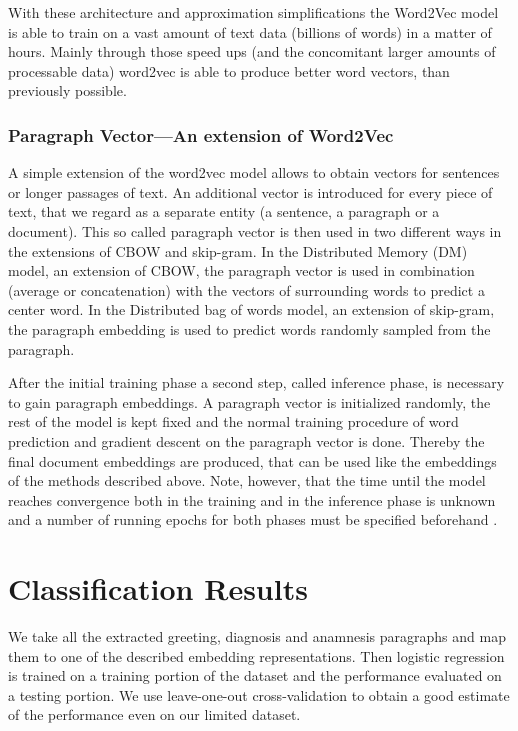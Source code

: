 With these architecture and approximation simplifications the Word2Vec
model is able to train on a vast amount of text data (billions of
words) in a matter of hours. Mainly through those speed ups (and the concomitant larger amounts of processable data) word2vec is able to produce better word vectors, than previously possible.

\subsubsection*{Paragraph Vector---An extension of Word2Vec}

A simple extension of the word2vec model allows to obtain vectors
for sentences or longer passages of text. An additional vector is
introduced for every piece of text, that we regard as a separate entity
(a sentence, a paragraph or a document). This so called paragraph
vector is then used in two different ways in the extensions of CBOW
and skip-gram. In the Distributed Memory (DM) model, an extension
of CBOW, the paragraph vector is used in combination (average or concatenation)
with the vectors of surrounding words to predict a center word. In
the Distributed bag of words model, an extension of skip-gram, the
paragraph embedding is used to predict words randomly sampled from
the paragraph.

After the initial training phase a second step, called inference phase, is necessary to gain paragraph embeddings. A paragraph vector is initialized randomly, the rest of the model is kept fixed and the normal training procedure of word prediction and gradient descent on the paragraph vector is done. Thereby the final document embeddings are produced, that can be used like the embeddings of the methods described above. Note, however, that the time until the model reaches convergence both in the training and in the inference phase is unknown and a number of running epochs for both phases must be specified beforehand \citep{Le2014}.





\section*{Classification Results}

We take all the extracted greeting, diagnosis and anamnesis paragraphs and map them to one of the described embedding representations. Then logistic regression is trained on a training portion of the dataset and the performance evaluated on a testing portion. We use leave-one-out cross-validation to obtain a good estimate of the performance even on our limited dataset.

